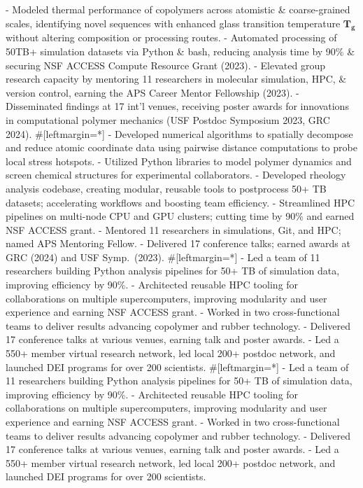 - Modeled thermal performance of copolymers across atomistic \& coarse-grained scales, identifying novel sequences with enhanced glass transition temperature $\bm{T_g}$ without altering composition or processing routes.
- Automated processing of 50TB+ simulation datasets via Python \& bash, reducing analysis time by 90\% \& securing NSF ACCESS Compute Resource Grant (2023).
- Elevated group research capacity by mentoring 11 researchers in molecular simulation, HPC, \& version control, earning the APS Career Mentor Fellowship (2023).
- Disseminated findings at 17 int'l venues, receiving poster awards for innovations in computational polymer mechanics (USF Postdoc Symposium 2023, GRC 2024).
#[leftmargin=*]
- Developed numerical algorithms to spatially decompose and reduce atomic coordinate data using pairwise distance computations to probe local stress hotspots.
- Utilized Python libraries to model polymer dynamics and screen chemical structures for experimental collaborators.
- Developed rheology analysis codebase, creating modular, reusable tools to postprocess 50+ TB datasets; accelerating workflows and boosting team efficiency.
- Streamlined HPC pipelines on multi-node CPU and GPU clusters; cutting time by 90\% and earned NSF ACCESS grant.
- Mentored 11 researchers in simulations, Git, and HPC; named APS Mentoring Fellow.
- Delivered 17 conference talks; earned awards at GRC (2024) and USF Symp.~(2023).
#[leftmargin=*]
- Led a team of 11 researchers building Python analysis pipelines for 50+ TB of simulation data, improving efficiency by 90\%.
- Architected reusable HPC tooling for collaborations on multiple supercomputers, improving modularity and user experience and earning NSF ACCESS grant.
- Worked in two cross-functional teams to deliver results advancing copolymer and rubber technology.
- Delivered 17 conference talks at various venues, earning talk and poster awards.
- Led a 550+ member virtual research network, led local 200+ postdoc network, and launched DEI programs for over 200 scientists.
#[leftmargin=*]
- Led a team of 11 researchers building Python analysis pipelines for 50+ TB of simulation data, improving efficiency by 90\%.
- Architected reusable HPC tooling for collaborations on multiple supercomputers, improving modularity and user experience and earning NSF ACCESS grant.
- Worked in two cross-functional teams to deliver results advancing copolymer and rubber technology.
- Delivered 17 conference talks at various venues, earning talk and poster awards.
- Led a 550+ member virtual research network, led local 200+ postdoc network, and launched DEI programs for over 200 scientists.
